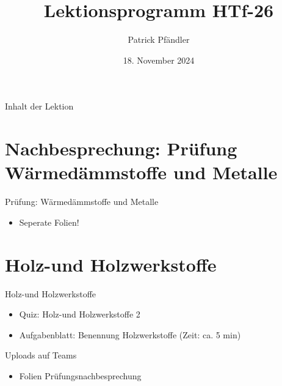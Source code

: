 

\title{\textbf{Lektionsprogramm HTf-26}}
\author{Patrick Pfändler}
\date{18. November 2024}




\frame{\titlepage}

\begin{frame}{Inhalt der Lektion}
    \tableofcontents
\end{frame}


\section{Nachbesprechung: Prüfung Wärmedämmstoffe und Metalle}
\begin{frame}{Prüfung: Wärmedämmstoffe und Metalle}
    \begin{itemize}
        \item Seperate Folien!
    \end{itemize}
\end{frame}


\section{Holz-und Holzwerkstoffe}
\begin{frame}{Holz-und Holzwerkstoffe}
\begin{itemize}
	\item[\textbullet] Quiz: Holz-und Holzwerkstoffe 2
	\item[\textbullet] Aufgabenblatt: Benennung Holzwerkstoffe (Zeit: ca. 5 min)
\end{itemize}	
\end{frame}





\begin{frame}{Uploads auf Teams}
    \begin{itemize}
        \item[\textbullet] Folien Prüfungsnachbesprechung
    \end{itemize}
    
\end{frame}

    
\folieFragen


